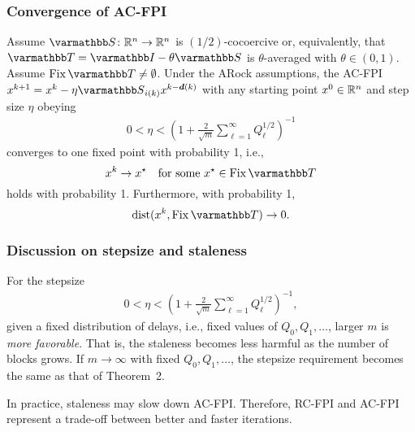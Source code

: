 \documentclass[10pt,mathserif]{beamer}
\begin{document}
\begin{frame}
\setcounter{theorem}{2}
\frametitle{Convergence of AC-FPI}
\begin{theorem}
\label{thm:ac-fpi}
Assume $\opS\colon\reals^n\rightarrow\reals^n$ is $(1/2)$-cocoercive or, equivalently, that $\opT=\opI-\theta \opS$ is $\theta$-averaged with $\theta\in(0,1)$. Assume $\fix \opT\ne \emptyset$.
Under the ARock assumptions, the AC-FPI $x^{k+1}=x^k-\eta \opS_{i(k)} x^{k-\vecdelay(k)}$ with any starting point $x^0\in \mathbb{R}^n$ and step size $\eta$ obeying
\begin{align*}
  0<\eta<\left(1+\frac{2}{\sqrt{m}}\sum_{\ell=1}^{\infty}Q_\ell^{1/2}\right)^{-1}
\end{align*}
converges to one fixed point with probability 1, i.e.,
\[
x^k\rightarrow x^\star\quad\text{for some}~ x^\star\in \fix \opT
\]
holds with probability 1.
Furthermore, with probability 1,
\[
\dist(x^{k},\fix \opT)
\rightarrow
0.
\]
\vspace{-0.25in}
\end{theorem}
\end{frame}


\begin{frame}
\frametitle{Discussion on stepsize and staleness}
For the stepsize
\begin{align*}
  0<\eta<\left(1+\frac{2}{\sqrt{m}}\sum_{\ell=1}^{\infty}Q_\ell^{1/2}\right)^{-1},
\end{align*}
given a fixed distribution of delays, i.e., fixed values of $Q_0,Q_1,\dots$, larger $m$ is \emph{more favorable}.
That is, the staleness becomes less harmful as the number of blocks grows.
If $m\rightarrow \infty$ with fixed $Q_0,Q_1,\dots$, the stepsize requirement becomes the same as that of Theorem~2.


\vspace{0.2in}

In practice, staleness may slow down AC-FPI.
Therefore, RC-FPI and AC-FPI represent a trade-off between better and faster iterations.
\end{frame}
\end{document}
